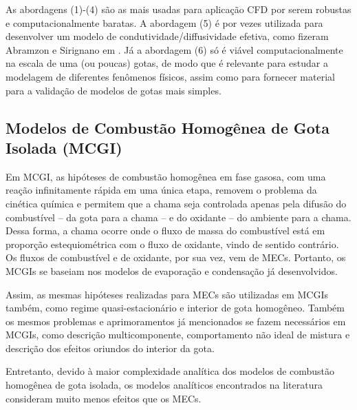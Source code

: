 As abordagens (1)-(4) são as mais usadas para aplicação CFD por serem robustas e computacionalmente baratas. 
A abordagem (5) é por vezes  utilizada para desenvolver um modelo de condutividade/diffusividade efetiva, como fizeram Abramzon e Sirignano em \cite{Sirignano1989}.
Já a abordagem (6) só é viável computacionalmente na escala de uma (ou poucas) gotas, de modo que é relevante para estudar a modelagem de diferentes fenômenos físicos, assim como para fornecer material para a validação de modelos de gotas mais simples.




\subsection{Modelos de Combustão Homogênea de Gota Isolada (MCGI)} \label{sec:MCGI}

Em MCGI, as hipóteses de combustão homogênea em fase gasosa, com uma reação infinitamente rápida em uma única etapa, removem o problema da cinética química e permitem que a chama seja controlada apenas pela difusão do combustível -- da gota para a chama -- e do oxidante -- do ambiente para a chama.
Dessa forma, a chama ocorre onde o fluxo de massa do combustível está em proporção estequiométrica com o fluxo de oxidante, vindo de sentido contrário. 
Os fluxos de combustível e de oxidante, por sua vez, vem de MECs.
Portanto, os MCGIs se baseiam nos modelos de evaporação e condensação já desenvolvidos.

Assim, as mesmas hipóteses realizadas para MECs são utilizadas em MCGIs também, como regime quasi-estacionário e interior de gota homogêneo.
Também os mesmos problemas e aprimoramentos já mencionados se fazem necessários em MCGIs, como descrição multicomponente, comportamento não ideal de mistura e  
descrição dos efeitos oriundos do interior da gota.

Entretanto, devido à maior complexidade analítica dos modelos de combustão homogênea de gota isolada, os modelos analíticos encontrados na literatura consideram muito menos efeitos que os MECs.

